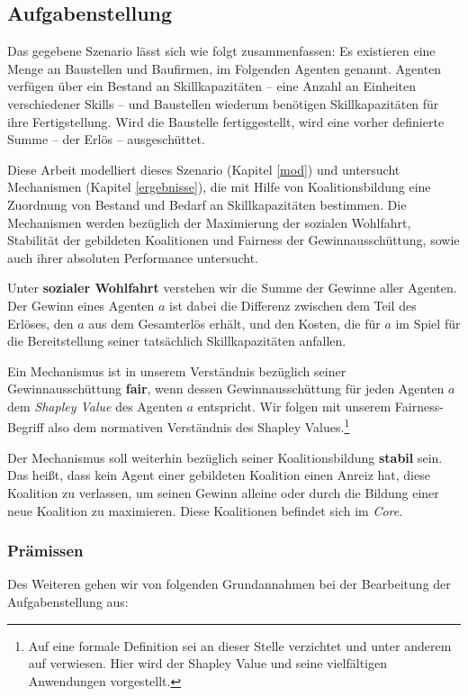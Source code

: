 \subsection{Aufgabenstellung}
\label{task}
Das gegebene Szenario lässt sich wie folgt zusammenfassen: Es existieren eine Menge an Baustellen und Baufirmen, im Folgenden Agenten genannt. Agenten verfügen über ein Bestand an Skillkapazitäten -- eine Anzahl an Einheiten verschiedener Skills -- und Baustellen wiederum benötigen Skillkapazitäten für ihre Fertigstellung. Wird die Baustelle fertiggestellt, wird eine vorher definierte Summe -- der Erlös -- ausgeschüttet.

Diese Arbeit modelliert dieses Szenario (Kapitel \ref{mod}) und untersucht Mechanismen (Kapitel \ref{ergebnisse}), die mit Hilfe von Koalitionsbildung eine Zuordnung von Bestand und Bedarf an Skillkapazitäten bestimmen. Die Mechanismen werden bezüglich der Maximierung der sozialen Wohlfahrt, Stabilität der gebildeten Koalitionen und Fairness der Gewinnausschüttung, sowie auch ihrer absoluten Performance untersucht.

Unter \textbf{sozialer Wohlfahrt} verstehen wir die Summe der Gewinne aller Agenten. Der Gewinn eines Agenten $a$ ist dabei die Differenz zwischen dem Teil des Erlöses, den $a$ aus dem Gesamterlös erhält, und den Kosten, die für $a$ im Spiel für die Bereitstellung seiner tatsächlich Skillkapazitäten anfallen.

Ein Mechanismus ist in unserem Verständnis bezüglich seiner Gewinnausschüttung \textbf{fair}, wenn dessen Gewinnausschüttung für jeden Agenten $a$ dem \textit{Shapley Value} des Agenten $a$ entspricht. Wir folgen mit unserem Fairness-Begriff also dem normativen Verständnis des Shapley Values.\footnote{Auf eine formale Definition sei an dieser Stelle verzichtet und unter anderem auf \cite{Moretti2008} verwiesen. Hier wird der Shapley Value und seine vielfältigen Anwendungen vorgestellt.}

Der Mechanismus soll weiterhin bezüglich seiner Koalitionsbildung \textbf{stabil} sein. Das heißt, dass kein Agent einer gebildeten Koalition einen Anreiz hat, diese Koalition zu verlassen, um seinen Gewinn alleine oder durch die Bildung einer neue Koalition zu maximieren. Diese Koalitionen befindet sich im \textit{Core}.

\subsubsection*{Prämissen}
Des Weiteren gehen wir von folgenden Grundannahmen bei der Bearbeitung der Aufgabenstellung aus:

